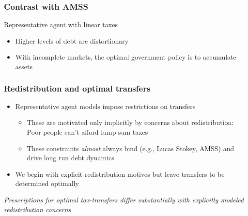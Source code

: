 \documentclass{beamer}
\begin{document}
\begin{frame}
\frametitle{Contrast with AMSS}
 Representative agent with linear taxes
\begin{itemize}
 \item Higher levels of debt are distortionary
 \item With incomplete markets, the optimal  government policy is to accumulate assets
 \end{itemize}

 \end{frame}

 \begin{frame}
 \frametitle{Redistribution and optimal transfers}
 \begin{itemize}
  \item Representative agent models impose restrictions on transfers
  \begin{itemize}
 \item These are motivated only implicitly by concerns about  redistribution:  Poor people can't afford lump sum taxes
  \item These constraints \emph{almost} always bind (e.g.,  Lucas Stokey, AMSS) and drive long run debt dynamics
  \end{itemize}
\item We begin with explicit redistribution motives but leave transfers to be determined optimally
 \end{itemize}

 \vspace{4mm}
 \color{red}\emph{Prescriptions for optimal tax-transfers differ substantially with explicitly modeled redistribution concerns}
 \end{frame}
\end{document}
